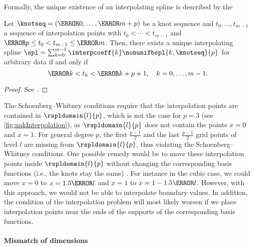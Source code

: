 Formally, the unique existence of an interpolating spline is
described by the 

\begin{proposition}
  \label{prop:schoenbergWhitneyConditions}
  Let $\knotseq = (\knot{0}, \dotsc, \knot{m+p})$ be a knot sequence
  and $t_0, \dotsc, t_{m-1}$ a sequence of interpolation points with
  $t_0 < \dotsb < t_{m-1}$ and
  $\knot{p} \le t_0 < t_{m-1} \le \knot{m}$.
  Then, there exists a unique interpolating spline
  $\spl = \sum_{k=0}^{m-1} \interpcoeff{k} \nonunifbspl{k,\knotseq}{p}$
  for arbitrary data if and only if
  \begin{equation}
    \knot{k} < t_k < \knot{k+p+1},\quad
    k = 0, \dotsc, m - 1.
  \end{equation}
\end{proposition}

\vspace*{0pt plus 0.3fill}

\begin{proof}
  See \cite{Hoellig13Approximation}.
\end{proof}

\vspace*{0pt plus 1.0fill}

The Schoenberg--Whitney conditions require that the interpolation points
are contained in $\rspldomain{l}{p}$,
which is not the case for $p = 3$ (see \cref{fig:nakInterpolation}),
as $\rspldomain{l}{p}$ does not contain the points $x = 0$ and $x = 1$.
For general degree $p$, the first $\tfrac{p-1}{2}$ and the
last $\tfrac{p-1}{2}$ grid points of level $l$ are
missing from $\rspldomain{l}{p}$,
thus violating the Schoenberg--Whitney conditions.
One possible remedy would be to move these interpolation points inside
$\rspldomain{l}{p}$ without changing the corresponding basis functions
(i.e., the knots stay the same) \cite{Hoellig13Approximation}.
For instance in the cubic case, we could move
$x = 0$ to $x = 1.5 \ms{l}$ and
$x = 1$ to $x = 1 - 1.5 \ms{l}$.
However, with this approach, we would not be able to interpolate
boundary values.
In addition, the condition of the interpolation problem will most likely
worsen if we place interpolation points near the ends of the supports
of the corresponding basis functions.

\pagebreak

\paragraph{Mismatch of dimensions}

